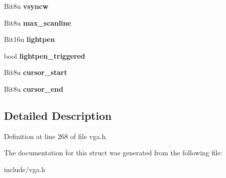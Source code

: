 \begin{DoxyCompactItemize}
\item 
\hypertarget{structVGA__OTHER_a6214860b81fc58e6a2b6712438cfdf87}{Bit8u {\bfseries vsyncw}}\label{structVGA__OTHER_a6214860b81fc58e6a2b6712438cfdf87}

\item 
\hypertarget{structVGA__OTHER_a5cda2fe9d1bbdb240fed75fbd4ebd54c}{Bit8u {\bfseries max\-\_\-scanline}}\label{structVGA__OTHER_a5cda2fe9d1bbdb240fed75fbd4ebd54c}

\item 
\hypertarget{structVGA__OTHER_aad2e4a57fdf43dd565398a1133880fe7}{Bit16u {\bfseries lightpen}}\label{structVGA__OTHER_aad2e4a57fdf43dd565398a1133880fe7}

\item 
\hypertarget{structVGA__OTHER_afdc8e6fe00dceb5d216a683d60e5c60d}{bool {\bfseries lightpen\-\_\-triggered}}\label{structVGA__OTHER_afdc8e6fe00dceb5d216a683d60e5c60d}

\item 
\hypertarget{structVGA__OTHER_ac1e5b1a383040b106970a2e96ffe7ba9}{Bit8u {\bfseries cursor\-\_\-start}}\label{structVGA__OTHER_ac1e5b1a383040b106970a2e96ffe7ba9}

\item 
\hypertarget{structVGA__OTHER_a15dd5380b25f09d7bd0e6eb8b8380cbe}{Bit8u {\bfseries cursor\-\_\-end}}\label{structVGA__OTHER_a15dd5380b25f09d7bd0e6eb8b8380cbe}

\end{DoxyCompactItemize}


\subsection{Detailed Description}


Definition at line 268 of file vga.\-h.



The documentation for this struct was generated from the following file\-:\begin{DoxyCompactItemize}
\item 
include/vga.\-h\end{DoxyCompactItemize}
